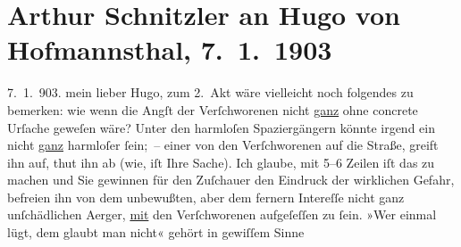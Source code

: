 

         
         \renewcommand{\erwaehntePersonen}{Personen: Hugo von Hofmannsthal}
         \renewcommand{\erwaehnteOrte}{Orte: Wien}
         \renewcommand{\erwaehnteWerke}{Werke: Das gerettete Venedig. Trauerspiel in fünf Aufzügen}
               \section[Arthur Schnitzler an Hugo von Hofmannsthal, 7. 1. 1903]{ Arthur Schnitzler an Hugo von Hofmannsthal, 7. 1. 1903}\nopagebreak{}\rehead{ }\begin{ledgroupsized}[t]{13cm}\normalsize\beginnumbering \toendnotes[C]{\smallbreak\pagebreak[2]} 
\toendnotes[C]{\smallbreak}\pstart
           {\pb}7. 1. 903.\pend
           \pstart
           mein lieber Hugo, zum 2. Akt wäre vielleicht noch folgendes zu bemerken: wie wenn
               die Angſt der Verſchworenen nicht \uline{ganz} ohne concrete
               Urſache geweſen wäre? Unter den harmloſen Spaziergängern könnte irgend ein nicht \uline{ganz} harmloſer ſein; – einer von den Verſchworenen auf
               die Straße, greift ihn auf, thut ihn ab \introOben{}(wie, iſt Ihre
                  Sache)\introOben{}. Ich glaube, mit 5–6 Zeilen iſt das zu machen und Sie gewinnen für
               den Zuſchauer den Eindruck der wirklichen Gefahr, befreien ihn von {\pb}dem unbewußten, aber dem fernern Intereſſe nicht ganz
               unſchädlichen Aerger, \uline{mit} den Verſchworenen
               aufgeſeſſen zu ſein. »Wer einmal lügt, dem glaubt man nicht« gehört in gewiſſem Sinne

\end{ledgroupsized}
